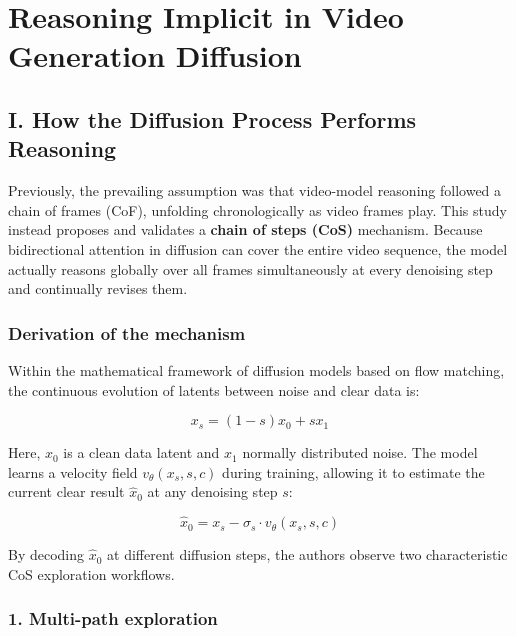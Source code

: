 \setcounter{section}{7}

\hypertarget{reasoning-implicit-in-video-generation-diffusion}{%
\section{Reasoning Implicit in Video Generation Diffusion}\label{reasoning-implicit-in-video-generation-diffusion}}

\hypertarget{i.-how-the-diffusion-process-performs-reasoning}{%
\subsection{I. How the Diffusion Process Performs Reasoning}\label{i.-how-the-diffusion-process-performs-reasoning}}

Previously, the prevailing assumption was that video-model reasoning followed a chain of frames (CoF), unfolding chronologically as video frames play. This study instead proposes and validates a \textbf{chain of steps (CoS)} mechanism. Because bidirectional attention in diffusion can cover the entire video sequence, the model actually reasons globally over all frames simultaneously at every denoising step and continually revises them.

\hypertarget{derivation-of-the-mechanism}{%
\subsubsection{Derivation of the mechanism}\label{derivation-of-the-mechanism}}

Within the mathematical framework of diffusion models based on flow matching, the continuous evolution of latents between noise and clear data is:

\[
x_s=(1-s)x_0+s x_1
\]

Here, \(x_0\) is a clean data latent and \(x_1\) normally distributed noise. The model learns a velocity field \(v_\theta(x_s,s,c)\) during training, allowing it to estimate the current clear result \(\hat{x}_0\) at any denoising step \(s\):

\[
\hat{x}_0=x_s-\sigma_s\cdot v_\theta(x_s,s,c)
\]

By decoding \(\hat{x}_0\) at different diffusion steps, the authors observe two characteristic CoS exploration workflows.

\hypertarget{multi-path-exploration}{%
\subsubsection{1. Multi-path exploration}\label{multi-path-exploration}}

